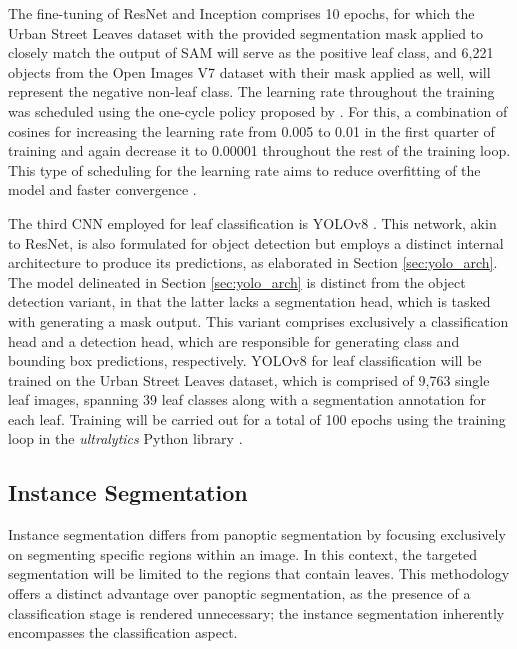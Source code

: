 \documentclass[draft,final]{vutinfth} %
\begin{document}
The fine-tuning of ResNet and Inception comprises 10 epochs, for which the Urban Street Leaves dataset \cite{yang_urban_2023} with the provided segmentation mask applied to closely match the output of SAM will serve as the positive leaf class, and 6,221 objects from the Open Images V7 dataset \cite{kuznetsova_open_2020} with their mask applied as well, will represent the negative non-leaf class. The learning rate throughout the training was scheduled using the one-cycle policy proposed by \citeauthor{smith_super-convergence_2018}. For this, a combination of cosines for increasing the learning rate from 0.005 to 0.01 in the first quarter of training and again decrease it to 0.00001 throughout the rest of the training loop. This type of scheduling for the learning rate aims to reduce overfitting of the model and faster convergence \cite{smith_super-convergence_2018}.

The third CNN employed for leaf classification is YOLOv8 \cite{yao_hp-yolov8_2024}. This network, akin to ResNet, is also formulated for object detection but employs a distinct internal architecture to produce its predictions, as elaborated in Section \ref{sec:yolo_arch}. The model delineated in Section \ref{sec:yolo_arch} is distinct from the object detection variant, in that the latter lacks a segmentation head, which is tasked with generating a mask output. This variant comprises exclusively a classification head and a detection head, which are responsible for generating class and bounding box predictions, respectively.
YOLOv8 for leaf classification will be trained on the Urban Street Leaves \cite{yang_urban_2023} dataset, which is comprised of 9,763 single leaf images, spanning 39 leaf classes along with a segmentation annotation for each leaf. Training will be carried out for a total of 100 epochs using the training loop in the \textit{ultralytics} Python library \cite{jocher_ultralytics_2023}.

\subsection{Instance Segmentation} \label{sec:meth_instance}

Instance segmentation differs from panoptic segmentation by focusing exclusively on segmenting specific regions within an image. In this context, the targeted segmentation will be limited to the regions that contain leaves. This methodology offers a distinct advantage over panoptic segmentation, as the presence of a classification stage is rendered unnecessary; the instance segmentation inherently encompasses the classification aspect.
\end{document}
